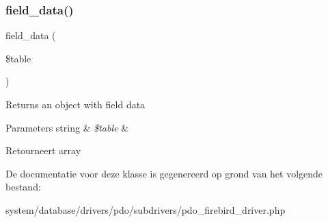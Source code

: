 \subsubsection{\texorpdfstring{field\_data()}{field\_data()}}
{\footnotesize\ttfamily field\+\_\+data (\begin{DoxyParamCaption}\item[{}]{\$table }\end{DoxyParamCaption})}

Returns an object with field data


\begin{DoxyParams}[1]{Parameters}
string & {\em \$table} & \\
\hline
\end{DoxyParams}
\begin{DoxyReturn}{Retourneert}
array 
\end{DoxyReturn}


De documentatie voor deze klasse is gegenereerd op grond van het volgende bestand\+:\begin{DoxyCompactItemize}
\item 
system/database/drivers/pdo/subdrivers/pdo\+\_\+firebird\+\_\+driver.\+php\end{DoxyCompactItemize}
